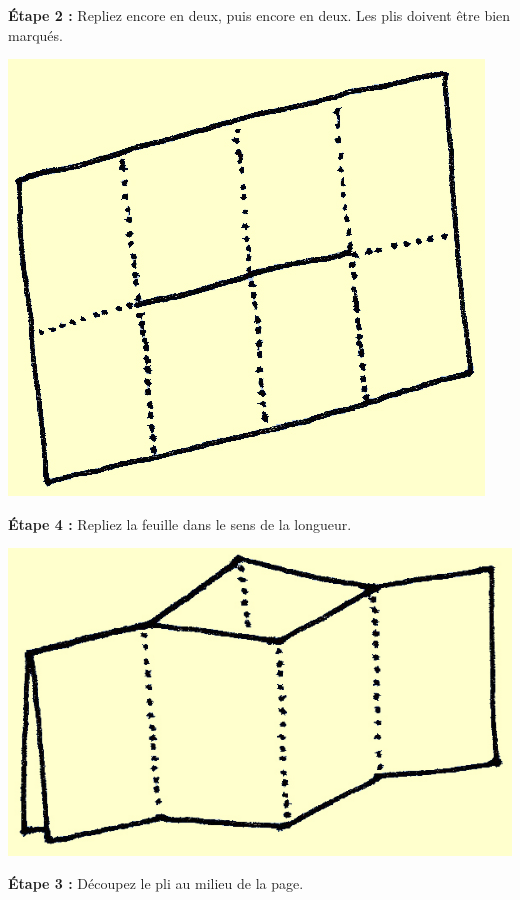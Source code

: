 \documentclass[a4paper,12pt]{article}
\begin{document}
\noindent
\begin{minipage}[b]{.45\linewidth}
\medskip
\noindent\textbf{Étape 2 :} Repliez encore en deux, puis encore en deux. Les plis doivent être
bien marqués.

\medskip \centerline{\includegraphics{img/ptitlivre-etape2.jpg}}

\medskip
\noindent\textbf{Étape 4 :} Repliez la feuille dans le sens de la longueur.\\

  \centerline{\includegraphics{img/ptitlivre-etape4.jpg}}

\end{minipage}\hfill\begin{minipage}[b]{.45\linewidth}
\noindent\textbf{Étape 3 :} Découpez le pli au milieu de la page.


\end{minipage}
\end{document}
